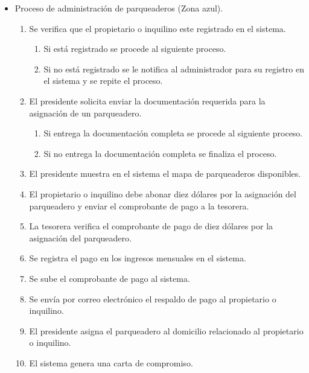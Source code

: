 \begin{itemize}
    \item Proceso de administración de parqueaderos (Zona azul).
    \begin{enumerate}
        \item Se verifica que el propietario o inquilino este registrado en el sistema.
        \begin{enumerate}
            \item Si está registrado se procede al siguiente proceso.
            \item Si no está registrado se le notifica al administrador para su registro en el sistema y se repite el proceso.
        \end{enumerate}
        \item El presidente solicita enviar la documentación requerida para la asignación de un parqueadero.
        \begin{enumerate}
            \item Si entrega la documentación completa se procede al siguiente proceso.
            \item Si no entrega la documentación completa se finaliza el proceso.
        \end{enumerate}
        \item El presidente muestra en el sistema el mapa de parqueaderos disponibles.
        \item El propietario o inquilino debe abonar diez dólares por la asignación del parqueadero y enviar el comprobante de pago a la tesorera.
        \item La tesorera verifica el comprobante de pago de diez dólares por la asignación del parqueadero.
        \item Se registra el pago en los ingresos mensuales en el sistema.
        \item Se sube el comprobante de pago al sistema.
        \item Se envía por correo electrónico el respaldo de pago al propietario o inquilino.
        \item El presidente asigna el parqueadero al domicilio relacionado al propietario o inquilino.
        \item El sistema genera una carta de compromiso.
    \end{enumerate}
    \begin{figure}[H]
        \centering

\end{figure}
\end{itemize}
